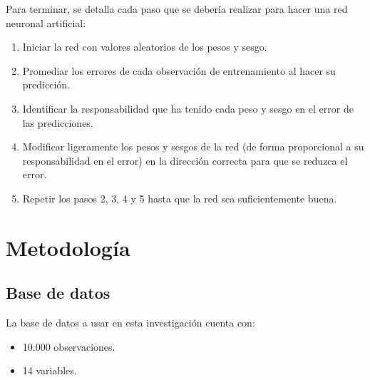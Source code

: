 \documentclass{report}
\begin{document}
Para terminar, se detalla cada paso que se debería realizar para hacer una red neuronal artificial:\\
        
\begin{enumerate}
        \item Iniciar la red con valores aleatorios de los pesos y sesgo.
        
        \item Promediar los errores de cada observación de entrenamiento al hacer su predicción.
        
        \item Identificar la responsabilidad que ha tenido cada peso y sesgo en el error de las predicciones.
        
        \item Modificar ligeramente los pesos y sesgos de la red (de forma proporcional a su
        responsabilidad en el error) en la dirección correcta para que se reduzca el error.
        
        \item  Repetir los pasos 2, 3, 4 y 5 hasta que la red sea suficientemente buena.
    \end{enumerate}        

\chapter{Metodología}\label{Metodología}
\section{Base de datos}
 La base de datos a usar en esta investigación cuenta con:\\
        \begin{itemize}
            \item 10.000 observaciones.
            \item 14 variables.
        \end{itemize}\\
        
\end{document}
